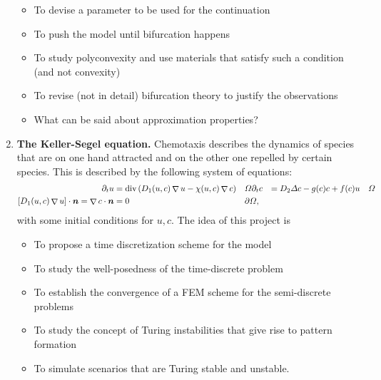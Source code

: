 \documentclass{article}
\renewcommand{\vec}{\vectorsym}
\DeclareMathOperator{\grad}{\nabla}
\DeclareMathOperator{\dive}{\text{div}}
\begin{document}
\begin{enumerate}
\begin{itemize}
                \item To devise a parameter to be used for the continuation 
                \item To push the model until bifurcation happens
                \item To study polyconvexity and use materials that satisfy such a condition (and not convexity)
                \item To revise (not in detail) bifurcation theory to justify the observations
                \item What can be said about approximation properties? 
            \end{itemize}
    \item \textbf{The Keller-Segel equation.} Chemotaxis describes the dynamics of species that are on one hand attracted and on the other one repelled by certain species. This is described by the following system of equations: 
        $$\begin{aligned}
            \partial_t u &= \dive\left(D_1(u,c)\grad u - \chi(u,c) \grad c\right) && \Omega
            \partial_t c &= D_2\Delta c - g(c) c + f(c) u && \Omega \\
            [D_1(u,c)\grad u]\cdot \vec n = \grad c\cdot \vec n &= 0 && \partial \Omega,
        \end{aligned} $$
        with some initial conditions for $u,c$. The idea of this project is
        \begin{itemize}
            \item To propose a time discretization scheme for the model 
            \item To study the well-posedness of the time-discrete problem
            \item To establish the convergence of a FEM scheme for the semi-discrete problems
            \item To study the concept of Turing instabilities that give rise to pattern formation
            \item To simulate scenarios that are Turing stable and unstable. 
        \end{itemize}

\end{enumerate}

\end{document}
